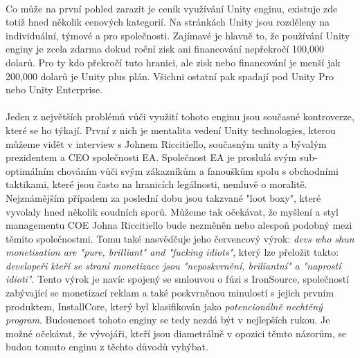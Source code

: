 
\paragraph{}
	Co může na první pohled zarazit je ceník využívání Unity enginu, existuje zde totiž hned několik cenových kategorií\cite{unity_pay_plan}.
	Na stránkách Unity jsou rozděleny na individuální, týmové a pro společnosti.
	Zajímavé je hlavně to, že používání Unity enginy je zcela zdarma dokud roční zisk ani financování nepřekročí 100,000 dolarů.
	Pro ty kdo překročí tuto hranici, ale zisk nebo financování je menší jak 200,000 dolarů je Unity plus plán.
	Všichni ostatní pak spadají pod  Unity Pro nebo Unity Enterprise.

\paragraph{}
	Jeden z největších problémů vůči využití tohoto enginu jsou současné kontroverze, které se ho týkají.
	První z nich je mentalita vedení Unity technologies, kterou můžeme vidět v interview s Johnem Riccitiello, současným  unity a bývalým prezidentem a \ac{CEO} společnosti EA.
	Společnost EA je proslulá svým sub-optimálním chováním vůči svým zákazníkům a fanouškům spolu s obchodními taktikami, které jsou často na hranicích legálnosti, nemluvě o moralitě.
	Nejznámějším případem za poslední dobu jsou takzvané "loot boxy"\cite{loot_box_wiki}, které vyvolaly hned několik soudních sporů.
	Můžeme tak očekávat, že myšlení a styl managementu COE Johna Riccitiello bude nezměněn nebo alespoň podobný mezi těmito společnostmi.
	Tomu také nasvědčuje jeho červencový výrok: \textit{devs who shun monetisation are "pure, brilliant" and "fucking idiots"}\cite{John_Riccitiello_interview}, který lze přeložit takto: \textit{developeři kteří se straní monetizace jsou "neposkvrnění, briliantní" a "naprostí idioti"}.
	Tento výrok je navíc spojený se smlouvou o fúzi s IronSource\cite{unity_ironSource_merger}, společností zabývající se monetizací reklam a také poskvrněnou minulostí  s jejich prvním produktem, InstallCore\cite{installCore_wiki}, který byl klasifikován jako \textit{potencionálně nechtěný program}\cite{PUP_wiki}.
	Budoucnost tohoto enginy se tedy nezdá být v nejlepších rukou.
	Je možné očekávat, že vývojáři, kteří jsou diametrálně v opozici těmto názorům, se budou tomuto enginu z těchto důvodů vyhýbat.


